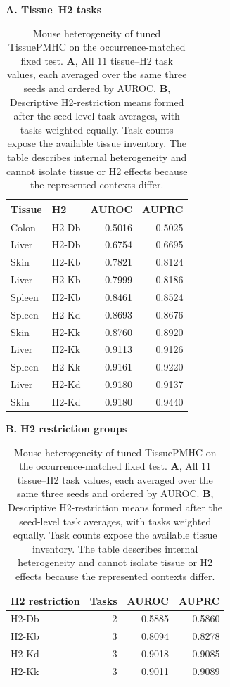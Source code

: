 \begin{table}[t]
\centering
\caption{Mouse heterogeneity of tuned TissuePMHC on the occurrence-matched fixed test. \textbf{A}, All 11 tissue--H2 task values, each averaged over the same three seeds and ordered by AUROC. \textbf{B}, Descriptive H2-restriction means formed after the seed-level task averages, with tasks weighted equally. Task counts expose the available tissue inventory. The table describes internal heterogeneity and cannot isolate tissue or H2 effects because the represented contexts differ.}
\label{tab:mouse-task-detail-new}
\footnotesize
\begin{minipage}[t]{0.57\textwidth}
\textbf{A. Tissue--H2 tasks}\par\smallskip
\begin{tabularx}{\linewidth}{>{\raggedright\arraybackslash}Xlrr}
\toprule
Tissue & H2 & AUROC & AUPRC \\
\midrule
Colon & H2-Db & 0.5016 & 0.5025 \\
Liver & H2-Db & 0.6754 & 0.6695 \\
Skin & H2-Kb & 0.7821 & 0.8124 \\
Liver & H2-Kb & 0.7999 & 0.8186 \\
Spleen & H2-Kb & 0.8461 & 0.8524 \\
Spleen & H2-Kd & 0.8693 & 0.8676 \\
Skin & H2-Kk & 0.8760 & 0.8920 \\
Liver & H2-Kk & 0.9113 & 0.9126 \\
Spleen & H2-Kk & 0.9161 & 0.9220 \\
Liver & H2-Kd & 0.9180 & 0.9137 \\
Skin & H2-Kd & 0.9180 & 0.9440 \\
\bottomrule
\end{tabularx}
\end{minipage}
\hfill
\begin{minipage}[t]{0.35\textwidth}
\textbf{B. H2 restriction groups}\par\smallskip
\centering
\begin{tabular}{lrrr}
\toprule
H2 restriction & Tasks & AUROC & AUPRC \\
\midrule
H2-Db & 2 & 0.5885 & 0.5860 \\
H2-Kb & 3 & 0.8094 & 0.8278 \\
H2-Kd & 3 & 0.9018 & 0.9085 \\
H2-Kk & 3 & 0.9011 & 0.9089 \\
\bottomrule
\end{tabular}
\end{minipage}
\end{table}

